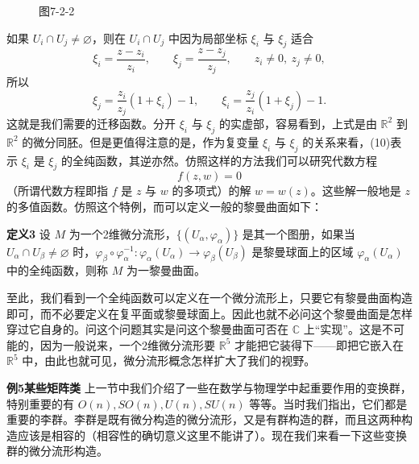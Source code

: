 \begin{figure}[htbp]
\centering
{}
\caption*{图7-2-2}
\end{figure}

如果 $U_i\cap U_j\ne\varnothing$，则在 $U_i\cap U_j$ 中因为局部坐标 $\xi_i$ 与 $\xi_j$ 适合
\[
 \xi_i=\frac{z-z_i}{z_i},\qquad \xi_j=\frac{z-z_j}{z_j},
 \qquad z_i\ne0,\ z_j\ne0,
\]
所以
\begin{equation}
 \xi_j=\frac{z_i}{z_j}(1+\xi_i)-1,
 \qquad
 \xi_i=\frac{z_j}{z_i}(1+\xi_j)-1.
 \tag{10}
\end{equation}
这就是我们需要的迁移函数。分开 $\xi_i$ 与 $\xi_j$ 的实虚部，容易看到，上式是由 $\mathbb R^2$ 到 $\mathbb R^2$ 的微分同胚。但是更值得注意的是，作为复变量 $\xi_i$ 与 $\xi_j$ 的关系来看，(10)表示 $\xi_i$ 是 $\xi_j$ 的全纯函数，其逆亦然。仿照这样的方法我们可以研究代数方程
\[
 f(z,w)=0
\]
（所谓代数方程即指 $f$ 是 $z$ 与 $w$ 的多项式）的解 $w=w(z)$。这些解一般地是 $z$ 的多值函数。仿照这个特例，而可以定义一般的黎曼曲面如下：

\noindent\textbf{定义3}\quad
设 $M$ 为一个2维微分流形，$\{(U_\alpha,\varphi_\alpha)\}$ 是其一个图册，如果当 $U_\alpha\cap U_\beta\ne\varnothing$ 时，$\varphi_\beta\circ\varphi_\alpha^{-1}:\varphi_\alpha(U_\alpha)\to\varphi_\beta(U_\beta)$ 是黎曼球面上的区域 $\varphi_\alpha(U_\alpha)$ 中的全纯函数，则称 $M$ 为一黎曼曲面。

至此，我们看到一个全纯函数可以定义在一个微分流形上，只要它有黎曼曲面构造即可，而不必要定义在复平面或黎曼球面上。因此也就不必问这个黎曼曲面是怎样穿过它自身的。问这个问题其实是问这个黎曼曲面可否在 $\mathbb C$ 上“实现”。这是不可能的，因为一般说来，一个2维微分流形要 $\mathbb R^5$ 才能把它装得下——即把它嵌入在 $\mathbb R^5$ 中，由此也就可见，微分流形概念怎样扩大了我们的视野。

\noindent\textbf{例5\quad 某些矩阵类}\quad
上一节中我们介绍了一些在数学与物理学中起重要作用的变换群，特别重要的有 $O(n),SO(n),U(n),SU(n)$ 等等。当时我们指出，它们都是重要的李群。李群是既有微分构造的微分流形，又是有群构造的群，而且这两种构造应该是相容的（相容性的确切意义这里不能讲了）。现在我们来看一下这些变换群的微分流形构造。

